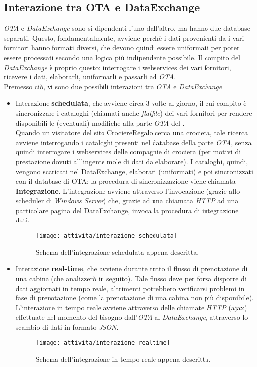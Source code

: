 \subsection{Interazione tra OTA e DataExchange}
\textit{OTA} e \textit{DataExchange} sono sì dipendenti l'uno dall'altro, ma hanno due database separati. Questo, fondamentalmente, avviene perchè i dati provenienti da i vari fornitori hanno formati diversi, che devono quindi essere uniformati per poter essere processati secondo una logica più indipendente possibile. Il compito del \textit{DataExchange} è proprio questo: interrogare i \glspl{webservice} dei vari fornitori, ricevere i dati, elaborarli, uniformarli e passarli ad \textit{OTA}.\\
Premesso ciò, vi sono due possibili interazioni tra \textit{OTA} e \textit{DataExchange}
\begin{itemize}
	\item Interazione \textbf{schedulata}, che avviene circa 3 volte al giorno, il cui compito è sincronizzare i cataloghi (chiamati anche \textit{flatfile}) dei vari fornitori per rendere disponibili le (eventuali) modifiche alla parte \textit{OTA} del \bookingEngine. \\Quando un visitatore del sito CrociereRegalo cerca una crociera, tale ricerca avviene interrogando i cataloghi presenti nel database della parte \textit{OTA}, senza quindi interrogare i \glspl{webservice} delle compagnie di crociera (per motivi di prestazione dovuti all'ingente mole di dati da elaborare). I cataloghi, quindi, vengono scaricati nel DataExchange, elaborati (uniformati) e poi sincronizzati con il database di OTA; la procedura di sincronizzazione viene chiamata \textbf{Integrazione}. L'integrazione avviene attraverso l'invocazione (grazie allo scheduler di \textit{Windows Server}) che, grazie ad una chiamata \textit{HTTP} ad una particolare pagina del DataExchange, invoca la procedura di integrazione dati.
	\begin{figure}[!h] 
		\centering 
		\texttt{[image: attivita/interazione\_schedulata]} 
		\caption{Schema dell'integrazione schedulata appena descritta.}
	\end{figure}
	\item Interazione \textbf{real-time}, che avviene durante tutto il flusso di prenotazione di una cabina (che analizzerò in seguito). Tale flusso deve per forza disporre di dati aggiornati in tempo reale, altrimenti potrebbero verificarsi problemi in fase di prenotazione (come la prenotazione di una cabina non più disponibile). L'interazione in tempo reale avviene attraverso delle chiamate \textit{HTTP} (ajax) effettuate nel momento del bisogno dall'\textit{OTA} al \textit{DataExchange}, attraverso lo scambio di dati in formato \textit{JSON}.
	\begin{figure}[!h] 
		\centering 
		\texttt{[image: attivita/interazione\_realtime]} 
		\caption{Schema dell'integrazione in tempo reale appena descritta.}
	\end{figure}
\end{itemize}

